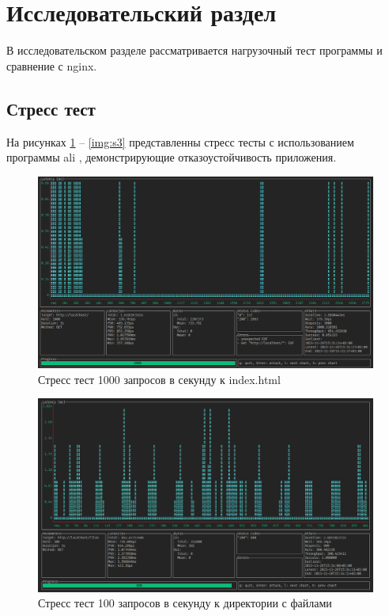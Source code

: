 \section{Исследовательский раздел}

В исследовательском разделе рассматривается нагрузочный тест программы и сравнение с nginx.

\subsection{Стресс тест}

На рисунках \ref{img:s1} -- \ref{img:s3} представленны стресс тесты с использованием программы ali \cite{ali}, демонстрирующие отказоустойчивость приложения.

\begin{figure}[H]
    \begin{center}
        \includegraphics[width=0.95\linewidth]{inc/img/1000_select.png}
        \caption{Стресс тест 1000 запросов в секунду к index.html}
        \label{img:s1}
    \end{center}
\end{figure}


\begin{figure}[H]
    \begin{center}
        \includegraphics[width=0.95\linewidth]{inc/img/100_files.png}
        \caption{Стресс тест 100 запросов в секунду к директории с файлами}
        \label{img:s2}
    \end{center}
\end{figure}



